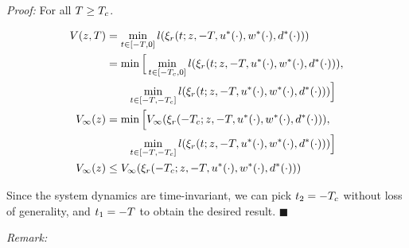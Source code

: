\textit{Proof:} For all $T \ge T_c$.
   
   \begin{equation}
   \begin{aligned}
   V(z, T) &= \min_{t \in [-T, 0]} l(\xi_r(t; z, -T, u^*(\cdot), w^*(\cdot), d^*(\cdot))) \\
   &= \min \Big[ \min_{t \in [-T_c, 0]} l(\xi_r(t; z, -T, u^*(\cdot), w^*(\cdot), d^*(\cdot))), \\
   &\qquad\min_{t \in [-T, -T_c]} l(\xi_r(t; z, -T, u^*(\cdot), w^*(\cdot), d^*(\cdot))) \Big] \\
   V_\infty(z) &= \min \Big[ V_\infty(\xi_r(-T_c; z, -T, u^*(\cdot), w^*(\cdot), d^*(\cdot))), \\
   &\qquad\min_{t \in [-T, -T_c]} l(\xi_r(t; z, -T, u^*(\cdot), w^*(\cdot), d^*(\cdot))) \Big] \\
   V_\infty(z) &\le V_\infty(\xi_r(-T_c; z, -T, u^*(\cdot), w^*(\cdot), d^*(\cdot))) \\
   \end{aligned}
   \end{equation}
   
   Since the system dynamics are time-invariant, we can pick $t_2 = -T_c$ without loss of generality, and $t_1 = -T$ to obtain the desired result. \hfill $\blacksquare$
 
 \textit{Remark:} 
